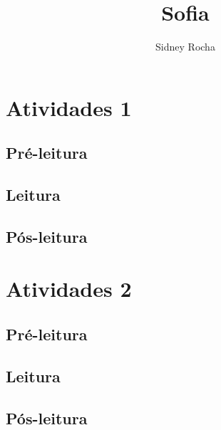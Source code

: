 \documentclass{extarticle}
\begin{document}
\newcommand{\AutorLivro}{Sidney Rocha}
\newcommand{\TituloLivro}{Sofia}
\newcommand{\Tema}{Ficção, mistério e fantasia}
\newcommand{\Genero}{Romance}
\newcommand{\issnppub}{---}
\newcommand{\issnepub}{---}
\newcommand{\colaborador}{\textbf{Fulano de Tal} é uma pessoa incrível e vai fazer um bom serviço.}


\title{\TituloLivro}
\author{\AutorLivro}
\def\authornotes{\colaborador}

\date{}
\maketitle

\begin{abstract}
\lipsum[1-3]
\end{abstract}

\tableofcontents




\section{Atividades 1}


\subsection{Pré-leitura}
\subsection{Leitura}
\subsection{Pós-leitura}



\section{Atividades 2}

\subsection{Pré-leitura}
\subsection{Leitura}
\subsection{Pós-leitura}

\lipsum
\end{document}
